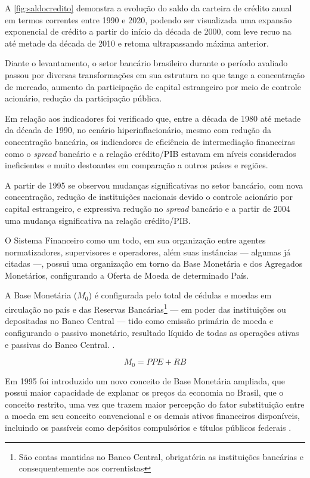\documentclass[12pt,12pt,openright,oneside,a4paper,chapter=TITLE,section=TITLE,subsection=TITLE,subsubsection=TITLE english,french,spanish,portugues,sumario=tradicional]{abntex2}
\begin{document}
A \autoref{fig:saldocredito} demonstra a evolução do saldo da carteira de
crédito anual em termos correntes entre 1990 e 2020, podendo ser visualizada
uma expansão exponencial de crédito a partir do início da década de 2000, com
leve recuo na até metade da década de 2010 e retoma ultrapassando máxima
anterior.

Diante o levantamento, o setor bancário brasileiro durante o período avaliado
passou por diversas transformações em sua estrutura no que tange a concentração
de mercado, aumento da participação de capital estrangeiro por meio de controle
acionário, redução da participação pública.

Em relação aos indicadores foi verificado que, entre a década de 1980 até metade da década de 1990, no cenário hiperinflacionário, mesmo com redução da
concentração bancária, os indicadores de eficiência de intermediação
financeiras como o \emph{spread} bancário e a relação crédito/PIB estavam em níveis
considerados ineficientes e muito destoantes em comparação a outros países e
regiões.

A partir de 1995 se observou mudanças significativas no setor bancário, com
nova concentração, redução de instituições nacionais devido o controle
acionário por capital estrangeiro, e expressiva redução no \emph{spread} bancário e
a partir de 2004 uma mudança significativa na relação crédito/PIB.

O Sistema Financeiro como um todo, em sua organização entre agentes normatizadores, supervisores e operadores, além suas instâncias --- algumas já citadas ---, possui uma organização em torno da Base Monetária e dos Agregados Monetários, configurando a Oferta de Moeda de determinado País.

A Base Monetária (\(M_0\)) é configurada pelo total de cédulas e moedas em circulação no país e das Reservas Bancárias\footnote{São contas mantidas no Banco Central, obrigatória as instituições bancárias e consequentemente aos correntistas} --- em poder das instituições ou depositadas no Banco Central --- tido como emissão primária de moeda e configurando o passivo monetário, resultado líquido de todas as operações ativas e passivas do Banco Central. \cite{bcb:2019}.

\[
M_0 = PPE + RB
\]

Em 1995 foi introduzido um novo conceito de Base Monetária ampliada, que possui maior capacidade de explanar os preços da economia no Brasil, que o conceito restrito, uma vez que trazem maior percepção do fator substituição entre a moeda em seu conceito convencional e os demais ativos financeiros disponíveis, incluindo os passíveis como depósitos compulsórios e títulos públicos federais \cite{bcb:2019}.
\end{document}
